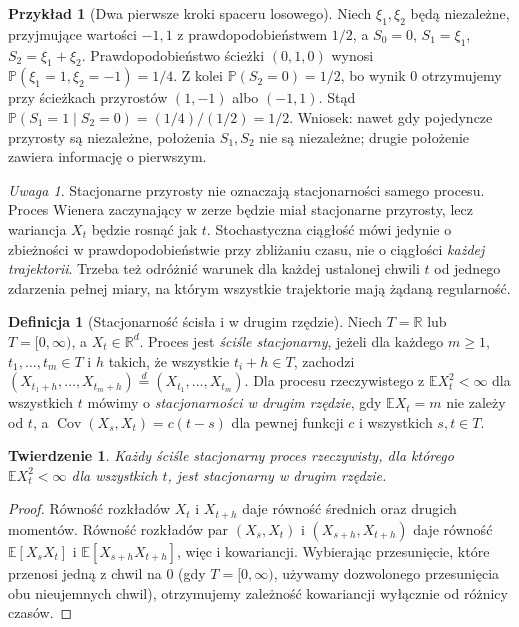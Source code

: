 \documentclass[11pt,a4paper,oneside]{report}
\numberwithin{equation}{chapter}
\theoremstyle{plain}
\newtheorem{twierdzenie}{Twierdzenie}[chapter]
\theoremstyle{definition}
\newtheorem{definicja}{Definicja}[chapter]
\newtheorem{przyklad}{Przykład}[chapter]
\theoremstyle{remark}
\newtheorem{uwaga}{Uwaga}[chapter]
\newcommand{\R}{\mathbb{R}}
\newcommand{\Prob}{\mathbb{P}}
\newcommand{\E}{\mathbb{E}}
\newcommand{\Cov}{\operatorname{Cov}}
\begin{document}
\begin{przyklad}[Dwa pierwsze kroki spaceru losowego]
Niech $\xi_1,\xi_2$ będą niezależne, przyjmujące
wartości $-1,1$ z prawdopodobieństwem $1/2$,
a $S_0=0$, $S_1=\xi_1$, $S_2=\xi_1+\xi_2$.
Prawdopodobieństwo ścieżki $(0,1,0)$ wynosi
$\Prob(\xi_1=1,\xi_2=-1)=1/4$.
Z kolei $\Prob(S_2=0)=1/2$, bo wynik $0$ otrzymujemy
przy ścieżkach przyrostów $(1,-1)$ albo $(-1,1)$.
Stąd $\Prob(S_1=1\mid S_2=0)=(1/4)/(1/2)=1/2$.
Wniosek: nawet gdy pojedyncze przyrosty są niezależne,
położenia $S_1,S_2$ nie są niezależne; drugie położenie
zawiera informację o pierwszym.
\end{przyklad}

\begin{uwaga}
Stacjonarne przyrosty nie oznaczają stacjonarności samego procesu.
Proces Wienera zaczynający w zerze będzie miał stacjonarne
przyrosty, lecz wariancja $X_t$ będzie rosnąć jak $t$.
Stochastyczna ciągłość mówi jedynie o zbieżności w prawdopodobieństwie
przy zbliżaniu czasu, nie o ciągłości \emph{każdej trajektorii}.
Trzeba też odróżnić warunek dla każdej ustalonej chwili $t$
od jednego zdarzenia pełnej miary, na którym wszystkie trajektorie
mają żądaną regularność.
\end{uwaga}

\begin{definicja}[Stacjonarność ścisła i w drugim rzędzie]
Niech $T=\R$ lub $T=[0,\infty)$, a $X_t\in\R^d$.
Proces jest \emph{ściśle stacjonarny}, jeżeli dla każdego
$m\ge1$, $t_1,\ldots,t_m\in T$ i $h$ takich, że wszystkie
$t_i+h\in T$, zachodzi
$(X_{t_1+h},\ldots,X_{t_m+h})\overset{d}= (X_{t_1},\ldots,X_{t_m})$.
Dla procesu rzeczywistego z $\E X_t^2<\infty$ dla wszystkich $t$
mówimy o \emph{stacjonarności w drugim rzędzie}, gdy
$\E X_t=m$ nie zależy od $t$, a $\Cov(X_s,X_t)=c(t-s)$
dla pewnej funkcji $c$ i wszystkich $s,t\in T$.
\end{definicja}

\begin{twierdzenie}
Każdy ściśle stacjonarny proces rzeczywisty,
dla którego $\E X_t^2<\infty$ dla wszystkich $t$,
jest stacjonarny w drugim rzędzie.
\end{twierdzenie}
\begin{proof}
Równość rozkładów $X_t$ i $X_{t+h}$ daje równość średnich
oraz drugich momentów. Równość rozkładów par
$(X_s,X_t)$ i $(X_{s+h},X_{t+h})$ daje równość
$\E[X_sX_t]$ i $\E[X_{s+h}X_{t+h}]$, więc i kowariancji.
Wybierając przesunięcie, które przenosi jedną z chwil na $0$
(gdy $T=[0,\infty)$, używamy dozwolonego przesunięcia
obu nieujemnych chwil), otrzymujemy zależność kowariancji
wyłącznie od różnicy czasów.
\end{proof}
\end{document}
